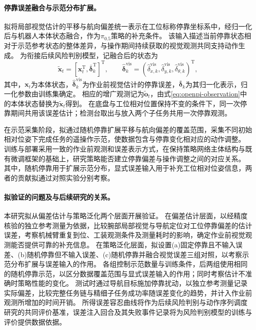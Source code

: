 \paragraph{停靠误差融合与示范分布扩展。}
拟将局部视觉估计的平移与航向偏差统一表示在工位标称停靠坐标系中，经归一化后与机器人本体状态融合，作为\(\pi_{0.5}\)策略的补充条件。
该输入描述当前停靠状态相对于示范参考状态的整体差异，与操作期间持续获取的视觉观测共同支持动作生成。
为衔接后续风险判别模型，记融合后的状态为
\begin{equation}
  \tilde{\mathbf x}_t
  =\left[\mathbf x_t^{\mathrm T},\bar{\boldsymbol\delta}_k^{\mathrm T}\right]^{\mathrm T},
  \qquad
  \widehat{\boldsymbol\delta}_k^{\mathrm{vis}}
  =\left(\widehat\delta_{x,k}^{\mathrm{vis}},
    \widehat\delta_{y,k}^{\mathrm{vis}},
    \widehat\delta_{\theta,k}^{\mathrm{vis}}\right)^{\mathrm T},
  \label{eq:residual-augmented-state}
\end{equation}
其中，\(\mathbf x_t\)为本体状态，\(\widehat{\boldsymbol\delta}_k^{\mathrm{vis}}\)为作业前视觉估计的停靠误差，\(\bar{\boldsymbol\delta}_k\)为其归一化表示，归一化参数由训练集确定。
相应的增广观测记为\(\tilde{\mathbf o}_t\)，由式\eqref{eq:openpi-observation}中的本体状态替换为\(\tilde{\mathbf x}_t\)得到。
在底盘与工位相对位置保持不变的条件下，同一次停靠期间共用该误差估计；检测台取出与放入两个子任务共用一次停靠观测。

在示范采集阶段，拟通过随机停靠扩展平移与航向偏差的覆盖范围，采集不同初始相对位姿下完成任务的遥操作示范，使数据包含与停靠变化相对应的动作调整。
训练与部署采用一致的作业前观测和误差表示方式，在保持策略网络主体结构与既有微调框架的基础上，研究策略能否建立停靠偏差与操作调整之间的对应关系。
其中，随机停靠用于扩展示范分布，显式误差输入用于补充工位相对位姿信息，两者的贡献拟通过对照实验分别考察。

\paragraph{拟验证的问题及与后续研究的关系。}
本研究拟从偏差估计与策略泛化两个层面开展验证。
在偏差估计层面，以经精度核验的独立参考测量为依据，比较腕部局部视觉与导航定位对工位停靠偏差的估计误差，考察机械臂重复到位、工装观测条件及测量耗时的影响，确定作业前视觉观测能否提供可靠的补充信息。
在策略泛化层面，拟设置(a)固定停靠且不输入误差、(b)随机停靠但不输入误差、(c)随机停靠并融合视觉误差三组对照，以考察示范分布扩展与误差输入的作用。
各组控制示范数量与训练条件，后两组使用相同的随机停靠示范，以区分数据覆盖范围与显式误差输入的作用；同时考察估计不准确时策略性能的变化。
测试时通过导航目标施加停靠扰动，以独立参考测量记录实际偏差，比较完整任务链与精细子任务成功率随误差变化的趋势，并计入作业前观测所增加的时间开销。
所得误差容忍曲线将作为后续风险判别与动作序列调度研究的共同评价基准，误差注入回合及其失败事件记录将为风险判别模型的训练与评价提供数据依据。

